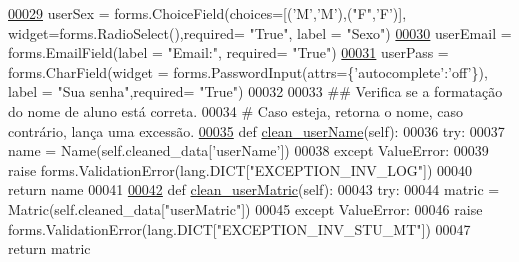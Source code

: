\begin{DoxyCode}
\hypertarget{Adm_2forms_8py_source_l00029}{}\hyperlink{classAdm_1_1forms_1_1AdmRegStu__ProfForm_af8e16ffbc31dfdec8496b7751bb51bed}{00029}     userSex = forms.ChoiceField(choices=[(\textcolor{stringliteral}{'M'},\textcolor{stringliteral}{'M'}),(\textcolor{stringliteral}{"F"},\textcolor{stringliteral}{'F'})], widget=forms.RadioSelect(),required= \textcolor{stringliteral}{"True"},
       label = \textcolor{stringliteral}{"Sexo"})
\hypertarget{Adm_2forms_8py_source_l00030}{}\hyperlink{classAdm_1_1forms_1_1AdmRegStu__ProfForm_a97ccca87a1c1c3a223e13d51e8196ef4}{00030}     userEmail =  forms.EmailField(label = \textcolor{stringliteral}{"Email:"}, required= \textcolor{stringliteral}{"True"})
\hypertarget{Adm_2forms_8py_source_l00031}{}\hyperlink{classAdm_1_1forms_1_1AdmRegStu__ProfForm_ad50fce73918c911541bd1c385d25eeca}{00031}     userPass = forms.CharField(widget = forms.PasswordInput(attrs=\{\textcolor{stringliteral}{'autocomplete'}:\textcolor{stringliteral}{'off'}\}), label = \textcolor{stringliteral}{"Sua
       senha"},required= \textcolor{stringliteral}{"True"})
00032     
00033     \textcolor{comment}{## Verifica se a formatação do nome de aluno está correta.}
00034     \textcolor{comment}{#   Caso esteja, retorna o nome, caso contrário, lança uma excessão.}
\hypertarget{Adm_2forms_8py_source_l00035}{}\hyperlink{classAdm_1_1forms_1_1AdmRegStu__ProfForm_a509b621082b91a521578a8c11f19b993}{00035}     \textcolor{keyword}{def }\hyperlink{classAdm_1_1forms_1_1AdmRegStu__ProfForm_a509b621082b91a521578a8c11f19b993}{clean\_userName}(self):
00036         \textcolor{keywordflow}{try}:
00037             name = Name(self.cleaned\_data[\textcolor{stringliteral}{'userName'}])
00038         \textcolor{keywordflow}{except} ValueError:
00039             \textcolor{keywordflow}{raise} forms.ValidationError(lang.DICT[\textcolor{stringliteral}{"EXCEPTION\_INV\_LOG"}])
00040         \textcolor{keywordflow}{return} name
00041 
\hypertarget{Adm_2forms_8py_source_l00042}{}\hyperlink{classAdm_1_1forms_1_1AdmRegStu__ProfForm_a86cae645930f3c11640abea65fcd1322}{00042}     \textcolor{keyword}{def }\hyperlink{classAdm_1_1forms_1_1AdmRegStu__ProfForm_a86cae645930f3c11640abea65fcd1322}{clean\_userMatric}(self):
00043         \textcolor{keywordflow}{try}:
00044             matric = Matric(self.cleaned\_data[\textcolor{stringliteral}{"userMatric"}])
00045         \textcolor{keywordflow}{except} ValueError:
00046             \textcolor{keywordflow}{raise} forms.ValidationError(lang.DICT[\textcolor{stringliteral}{"EXCEPTION\_INV\_STU\_MT"}])
00047         \textcolor{keywordflow}{return} matric

\end{DoxyCode}
